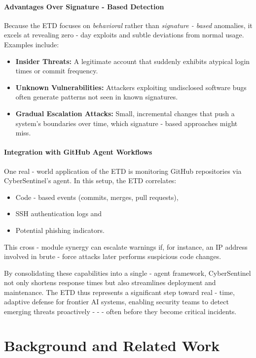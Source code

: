 \documentclass{article}
\begin{document}
\paragraph{Advantages Over Signature - Based Detection}
Because the ETD focuses on \emph{behavioral} rather than \emph{signature - based} anomalies, it excels at revealing zero - day exploits and subtle deviations from normal usage. Examples include:
\begin{itemize}
    \item \textbf{Insider Threats:} A legitimate account that suddenly exhibits atypical login times or commit frequency.
    \item \textbf{Unknown Vulnerabilities:} Attackers exploiting undisclosed software bugs often generate patterns not seen in known signatures.
    \item \textbf{Gradual Escalation Attacks:} Small, incremental changes that push a system’s boundaries over time, which signature - based approaches might miss.
\end{itemize}

\paragraph{Integration with GitHub Agent Workflows}
One real - world application of the ETD is monitoring GitHub repositories via CyberSentinel’s agent. In this setup, the ETD correlates:
\begin{itemize}
    \item Code - based events (commits, merges, pull requests),
    \item SSH authentication logs and
    \item Potential phishing indicators.
\end{itemize}
This cross - module synergy can escalate warnings if, for instance, an IP address involved in brute - force attacks later performs suspicious code changes.

By consolidating these capabilities into a single - agent framework, CyberSentinel not only shortens response times but also streamlines deployment and maintenance. The ETD thus represents a significant step toward real - time, adaptive defense for frontier AI systems, enabling security teams to detect emerging threats proactively -  -  - often before they become critical incidents.

\section{Background and Related Work}
\end{document}
